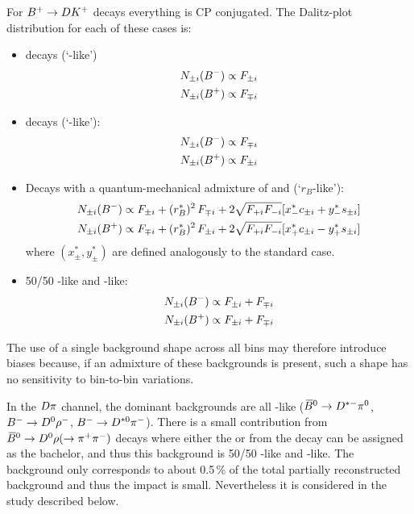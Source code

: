 For ${{{B}^+}}\rightarrow DK^+$ decays everything is CP conjugated. The Dalitz-plot distribution for each of these cases is:
\begin{itemize}
\item \Dz decays (`\Dz-like')
\begin{align}
\begin{split}
N_{\pm i}({{{B}^-}}) & \propto F_{\pm i} \label{eq:nD0} \\
N_{\pm i}({{{B}^+}}) & \propto F_{\mp i}
\end{split}
\end{align}
\item \Dzb decays (`\Dzb-like'):
\begin{align}{}
\begin{split}
N_{\pm i}({{{B}^-}}) & \propto F_{\mp i} \\
N_{\pm i}({{{B}^+}}) & \propto F_{\pm i}
\end{split}
\end{align}
\item Decays with a quantum-mechanical admixture of \Dz and \Dzb (`$r_B$-like'):
\begin{align}
\begin{split}
N_{\pm i}({{{B}^-}}) & \propto F_{\pm i} + (r_{B}^{*})^2\,F_{\mp i} + 2\sqrt{F_{+i}F_{-i}}[x_{-}^{*}c_{\pm i} + y_{-}^{*}s_{\pm i}] \\
N_{\pm i}({{{B}^+}}) & \propto F_{\mp i} + (r_{B}^{*})^2\,F_{\pm i} + 2\sqrt{F_{+i}F_{-i}}[x_{+}^{*}c_{\pm i} - y_{+}^{*}s_{\pm i}] \label{eq:nrB} 
\end{split}
\end{align}
where $(x_{\pm}^{*},y_{\pm}^{*})$ are defined analogously to the standard \BtoDK case.

\item 50/50 \Dz-like and \Dzb-like:
\begin{align}
\begin{split}
N_{\pm i}({{{B}^-}}) & \propto F_{\pm i} + F_{\mp i}  \\
N_{\pm i}({{{B}^+}}) & \propto F_{\pm i} + F_{\mp i}  \label{eq:n5050} 
\end{split}
\end{align}
\end{itemize}
The use of a single background shape across all bins may therefore introduce biases because, if an admixture of these backgrounds is present, such a shape has no sensitivity to bin-to-bin variations. 

In the ${D}\pi$ channel, the dominant backgrounds are all \Dz-like (${{\kern 0.18em\overline{\kern -0.18em B}}{}^0}\rightarrow{\ensuremath{{D}^{*-}}}{\ensuremath{{\pi}^0}}$, ${{{B}^-}}\rightarrow{\ensuremath{{D}^0}}\rho^-$, ${{{B}^-}}\rightarrow{\ensuremath{{D}^{*0}}}{\ensuremath{{\pi}^-}}$). There is a small contribution from ${{\kern 0.18em\overline{\kern -0.18em B}}{}^0}\rightarrow{\ensuremath{{D}^0}}\rho(\rightarrow{\ensuremath{{\pi}^+}}{\ensuremath{{\pi}^-}})$ decays where either the \pip or \pim from the \rhoz decay can be assigned as the bachelor, and thus this background is 50/50 \Dz-like and \Dzb-like. The background only corresponds to about 0.5\,\% of the total partially reconstructed background and thus the impact is small. Nevertheless it is considered in the study described below.

